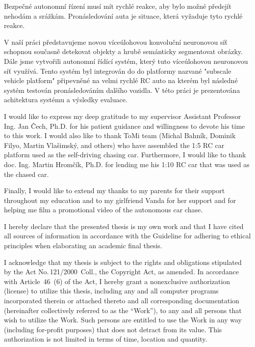 \begin{abstract-czech}
Bezpečné autonomní řízení musí mít rychlé reakce, aby bylo možné předejít nehodám a srážkám. Pronásledování auta je situace, která vyžaduje tyto rychlé reakce.


V naší práci představujeme novou víceúlohovou konvoluční neuronovou síť schopnou současně detekovat objekty a hrubě semánticky segmentovat obrázky. Dále jsme vytvořili autonomní řídící systém, který tuto víceúlohovou neuronovou síť využívá. Tento systém byl integrován do do platformy nazvané "subscale vehicle platform" připevněné na velmi rychlé RC auto na kterém byl následné systém testován pronásledováním dalšího vozidla. V této práci je prezentována achitektura systému a výsledky evaluace.
\end{abstract-czech}

\begin{thanks}
I would like to express my deep gratitude to my supervisor Assistant Professor Ing. Jan Čech, Ph.D. for his patient guidance and willingness to devote his time to this work. I would also like to thank ToMi team (Michal Bahník, Dominik Filyo, Martin Vlašimský, and others) who have assembled the 1:5 RC car platform used as the self-driving chasing car. Furthermore, I would like to thank doc. Ing. Martin Hromčík, Ph.D. for lending me his 1:10 RC car that was used as the chased car.\par


Finally, I would like to extend my thanks to my parents for their support throughout my education and to my girlfriend Vanda for her support and for helping me film a promotional video of the autonomous car chase.
\end{thanks}

\begin{declaration}
		I hereby declare that the presented thesis is my own work and that I have cited all sources of information in accordance with the Guideline for adhering to ethical principles when elaborating an academic final thesis.
		
		I acknowledge that my thesis is subject to the rights and obligations stipulated by the Act No.\,121/2000~Coll., the Copyright Act, as amended. In accordance with Article~46~(6) of the Act, I hereby grant a nonexclusive authorization (license) to utilize this thesis, including any and all computer programs incorporated therein or attached thereto and all corresponding documentation (hereinafter collectively referred to as the ``Work''), to any and all persons that wish to utilize the Work. Such persons are entitled to use the Work in any way (including for-profit purposes) that does not detract from its value. This authorization is not limited in terms of time, location and quantity.
\end{declaration}





